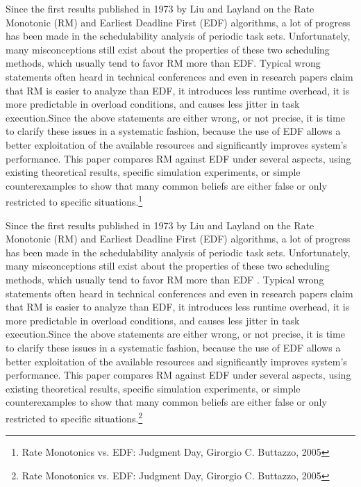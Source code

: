 \begin{frame}{\subsecname}
\tiny Since the first results published in 1973 by Liu and Layland on the Rate Monotonic (RM) and Earliest Deadline First (EDF) algorithms, a lot of progress has been made in the schedulability analysis of periodic task sets. Unfortunately, many \Large misconceptions \tiny still exist about the properties of these two scheduling methods, which usually tend to favor RM more than EDF. Typical wrong statements often heard in technical conferences and even in research papers claim that RM is easier to analyze than EDF, it introduces less runtime overhead, it is more predictable in overload conditions, and causes less jitter in task execution.Since the above statements are either wrong, or not precise, it is time to clarify these issues in a systematic fashion, because the use of EDF allows a better exploitation of the available resources and significantly improves system’s performance. This paper compares RM against EDF under several aspects, using existing theoretical results, specific simulation experiments, or simple counterexamples to show that many common beliefs are either false or only restricted to specific situations.\footnote{Rate Monotonics vs. EDF: Judgment Day, Girorgio C. Buttazzo, 2005}
\end{frame}
	
\begin{frame}{\subsecname}
\tiny Since the first results published in 1973 by Liu and Layland on the Rate Monotonic (RM) and Earliest Deadline First (EDF) algorithms, a lot of progress has been made in the schedulability analysis of periodic task sets. Unfortunately, many \Large misconceptions \tiny still exist about the properties of these two scheduling methods, which usually tend to \Large favor RM more than EDF \tiny. Typical wrong statements often heard in technical conferences and even in research papers claim that RM is easier to analyze than EDF, it introduces less runtime overhead, it is more predictable in overload conditions, and causes less jitter in task execution.Since the above statements are either wrong, or not precise, it is time to clarify these issues in a systematic fashion, because the use of EDF allows a better exploitation of the available resources and significantly improves system’s performance. This paper compares RM against EDF under several aspects, using existing theoretical results, specific simulation experiments, or simple counterexamples to show that many common beliefs are either false or only restricted to specific situations.\footnote{Rate Monotonics vs. EDF: Judgment Day, Girorgio C. Buttazzo, 2005}
\end{frame}

